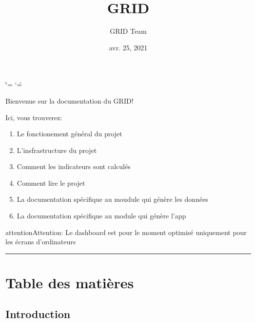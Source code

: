 \documentclass[letterpaper,10pt,french]{sphinxmanual}
\title{GRID}
\date{avr. 25, 2021}
\author{GRID Team}
\begin{document}
\ifdefined\shorthandoff
  \ifnum\catcode`\=\string=\active\shorthandoff{=}\fi
  \ifnum\catcode`\"=\active{}\fi
\fi

\pagestyle{empty}
\sphinxmaketitle
\pagestyle{plain}
\sphinxtableofcontents
\pagestyle{normal}
\label{\detokenize{index::doc}}


\sphinxAtStartPar
Bienvenue sur la documentation du GRID!

\sphinxAtStartPar
Ici, vous trouverez:
\begin{enumerate}
%
\item {} 
\sphinxAtStartPar
Le fonctionement général du projet

\item {} 
\sphinxAtStartPar
L’insfrastructure du projet

\item {} 
\sphinxAtStartPar
Comment les indicateurs sont calculés

\item {} 
\sphinxAtStartPar
Comment lire le projet

\item {} 
\sphinxAtStartPar
La documentation spécifique au moudule  qui génère les données

\item {} 
\sphinxAtStartPar
La documentation spécifique au module  qui génère l’app

\end{enumerate}

\sphinxAtStartPar
{}

\begin{sphinxadmonition}{attention}{Attention:}
\sphinxAtStartPar
Le dashboard est pour le moment optimisé uniquement pour les écrans d’ordinateurs
\end{sphinxadmonition}


\bigskip\hrule\bigskip



\chapter{Table des matières}
\label{\detokenize{index:table-des-matieres}}

\section{Introduction}
\label{\detokenize{intro:introduction}}\label{\detokenize{intro::doc}}
\end{document}
